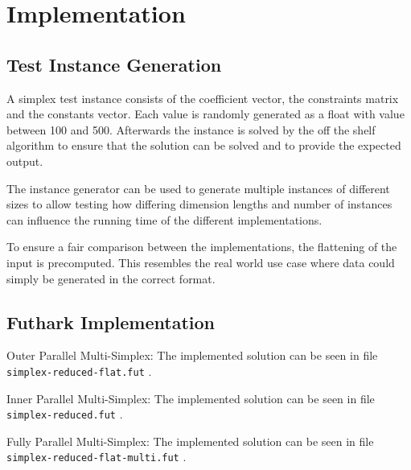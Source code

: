 \section{Implementation}
\subsection{Test Instance Generation}
A simplex test instance consists of the coefficient vector, the constraints matrix and the constants vector. Each value is randomly generated as a float with value between 100 and 500. Afterwards the instance is solved by the off the shelf algorithm to ensure that the solution can be solved and to provide the expected output. 

The instance generator can be used to generate multiple instances of different sizes to allow testing how differing dimension lengths and number of instances can influence the running time of the different implementations.

To ensure a fair comparison between the implementations, the flattening of the input is precomputed. This resembles the real world use case where data could simply be generated in the correct format. 

\subsection{Futhark Implementation}
Outer Parallel Multi-Simplex:
The implemented solution can be seen in file \texttt{simplex-reduced-flat.fut} .

\newpar
Inner Parallel Multi-Simplex:
The implemented solution can be seen in file \texttt{simplex-reduced.fut} .

\newpar
Fully Parallel Multi-Simplex:
The implemented solution can be seen in file \texttt{simplex-reduced-flat-multi.fut} .
